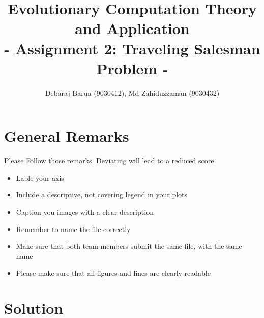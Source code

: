 \documentclass[a4paper, 12pt]{article}
\title{Evolutionary Computation Theory and Application  \\
				- Assignment 2: Traveling Salesman Problem -}
\author{Debaraj Barua (9030412), Md Zahiduzzaman (9030432)}
\date{}
\begin{document}
\maketitle

\section{General Remarks }

Please Follow those remarks. Deviating will lead to a reduced score

\begin{itemize}
	\item Lable your axis 
	\item Include a descriptive, not covering legend in your plots
	\item Caption you images with a clear description
	\item Remember to name the file correctly
	\item Make sure that both team members submit the same file, with the same name
	\item Please make sure that all figures and lines are clearly readable
\end{itemize}

\section{Solution}

\end{document}
